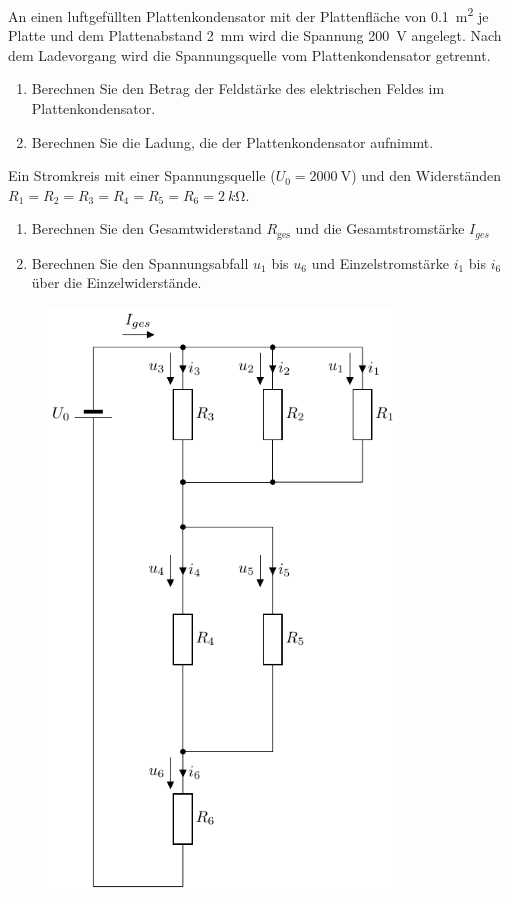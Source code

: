 \documentclass[11pt,a4paper]{scrartcl}
\begin{document}
\begin{question}{10}
An einen luftgefüllten Plattenkondensator mit der Plattenfläche von \SI{0.1}{m^2} je Platte und dem Plattenabstand \SI{2}{mm} wird die Spannung \SI{200}{V} angelegt. Nach dem Ladevorgang wird die Spannungsquelle vom Plattenkondensator getrennt.
\begin{enumerate}
	\item Berechnen Sie den Betrag der Feldstärke des elektrischen Feldes im Plattenkondensator.
	\item Berechnen Sie die Ladung, die der Plattenkondensator aufnimmt.
\end{enumerate}
\end{question}
\clearpage
\begin{question}{30}
	Ein Stromkreis mit einer Spannungsquelle ($U_0=\SI{2000}{\volt}$) und den Widerständen $R_1=R_2=R_3=R_4=R_5=R_6=\SI{2}{k\ohm}$. 
	\begin{enumerate}
		\item  Berechnen Sie den Gesamtwiderstand $R_{\text{ges}}$ und die Gesamtstromstärke $I_{ges}$
		\item Berechnen Sie den Spannungsabfall $u_1$ bis $u_6$  und Einzelstromstärke $i_1$ bis $i_6$ über die Einzelwiderstände.
	\end{enumerate}
	
	\begin{figure}[H]
		\centering
		\includegraphics[width=9.3cm]{template_schaltung}
	\end{figure}
\end{question}


{}
\end{document}
